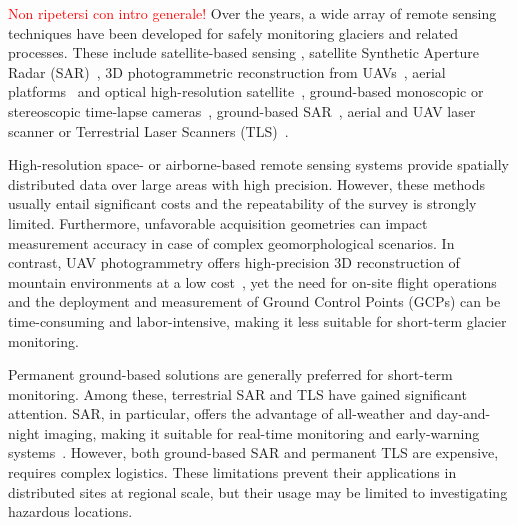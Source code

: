 \textcolor{red}{Non ripetersi con intro generale!}
Over the years, a wide array of remote sensing techniques have been developed for safely monitoring glaciers and related processes.
These include satellite-based sensing \citep{altena_kaab_2020,Scherler2008},
satellite Synthetic Aperture Radar (SAR)~\citep{Strozzi2020}, 
3D photogrammetric reconstruction from UAVs~\citep{Chudley2019,Ioli2022},
aerial platforms~\citep{Degaetani2021} and optical high-resolution satellite~\citep{Tonolo2020},
ground-based monoscopic or stereoscopic time-lapse cameras~\citep{Messerli2015,Schwalbe2017,Hendrickx2022},
ground-based SAR~\citep{Dematteis2018,Noferini2009}, 
aerial and UAV laser scanner \citep{Hartl2023} 
or Terrestrial Laser Scanners (TLS)~\citep{Hendrickx2022,Voordendag2023}.

High-resolution space- or airborne-based remote sensing systems provide spatially distributed data over large areas with high precision.
However, these methods usually entail significant costs and the repeatability of the survey is strongly limited.
Furthermore, unfavorable acquisition geometries can impact measurement accuracy in case of complex geomorphological scenarios. 
In contrast, UAV photogrammetry offers high-precision 3D reconstruction of mountain environments at a low cost~\citep{Chudley2019,Ioli2022},
yet the need for on-site flight operations and the deployment and measurement of Ground Control Points (GCPs) can be time-consuming and labor-intensive, making it less suitable for short-term glacier monitoring.

Permanent ground-based solutions are generally preferred for short-term monitoring.
Among these, terrestrial SAR and TLS have gained significant attention.
SAR, in particular, offers the advantage of all-weather and day-and-night imaging, making it suitable for
real-time monitoring and early-warning systems~\citep{Dematteis2021,Noferini2009}.
However, both ground-based SAR and permanent TLS are expensive, requires complex
logistics.
These limitations prevent their applications in distributed sites at regional scale, but
their usage may be limited to investigating hazardous locations.

